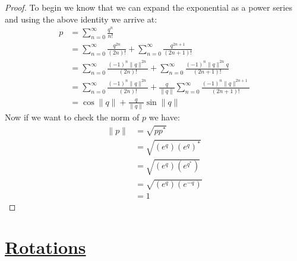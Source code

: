 \documentclass[12pt, letterpaper, onecolumn, conference, final]{IEEEtran}
\theoremstyle{definition}
\newtheorem{proposition}{Proposition}
\theoremstyle{plain}
\begin{document}
\begin{proof}
To begin we know that we can expand the exponential as a power series and using the above identity we arrive at:
\begin{equation*}
\begin{split}
p &= \sum_{n = 0}^\infty \frac{q^n}{n!} \\
&= \sum_{n = 0}^\infty \frac{q^{2n}}{(2n)!} + \sum_{n = 0}^\infty \frac{q^{2n + 1}}{(2n + 1)!} \\
&= \sum_{n = 0}^\infty \frac{(-1)^n \| q \|^{2n}}{(2n)!} + \sum_{n = 0}^\infty \frac{(-1)^n \| q \|^{2n} q}{(2n + 1)!} \\
&= \sum_{n = 0}^\infty \frac{(-1)^n \| q \|^{2n}}{(2n)!} + \frac{q}{\| q \|} \sum_{n = 0}^\infty \frac{(-1)^n \| q \|^{2n + 1}}{(2n + 1)!} \\
&= \cos\| q \| + \frac{q}{\| q \|}\sin\| q \|
\end{split}
\end{equation*}
Now if we want to check the norm of $p$ we have:
\begin{equation*}
\begin{split}
\| p \| &= \sqrt{pp^*} \\
&= \sqrt{(e^q)(e^q)^*} \\
&= \sqrt{(e^q)(e^{q^*})} \\
&= \sqrt{(e^q)(e^{-q})} \\
&= 1
\end{split}
\end{equation*}
\end{proof}

\newpage
\section*{\underline{\textbf{Rotations}}}
\vspace{.3cm}
\begin{center}
\end{center}
\end{document}
